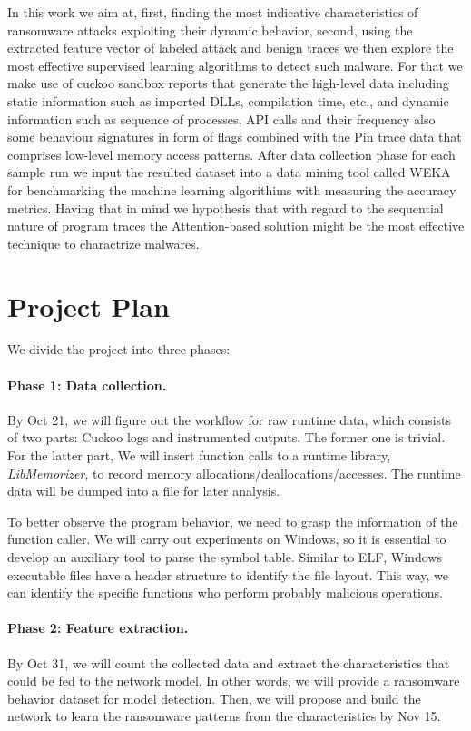 \documentclass[letterpaper,twocolumn,10pt]{article}
\begin{document}
In this work we aim at, first, finding the most indicative characteristics of ransomware attacks exploiting their dynamic behavior, second, using the extracted feature vector of labeled attack and benign traces we then explore the most effective supervised learning algorithms to detect such malware.
For that we make use of cuckoo sandbox reports that generate the high-level data including static information such as imported DLLs, compilation time, etc., and dynamic information such as sequence of processes, API calls and their frequency also some behaviour signatures in form of flags combined with the Pin trace data that comprises low-level memory access patterns. After data collection phase for each sample run we input the resulted dataset into a data mining tool called WEKA \cite{weka} for benchmarking the machine learning algorithims with measuring the accuracy metrics. 
Having that in mind we hypothesis that with regard to the sequential nature of program traces the Attention-based solution might be the most effective technique to charactrize malwares.

\section{Project Plan}

We divide the project into three phases:

\paragraph{Phase 1: Data collection.}

By Oct 21, we will figure out the workflow for raw runtime data, which consists of two parts: Cuckoo logs and instrumented outputs.
The former one is trivial. For the latter part, We will insert function calls to a runtime library, \textit{LibMemorizer}, to record memory allocations/deallocations/accesses. The runtime data will be dumped into a file for later analysis.

To better observe the program behavior, we need to grasp the information of the function caller.
We will carry out experiments on Windows, so it is essential to develop an auxiliary tool to parse the symbol table.
Similar to ELF, Windows executable files have a header structure to identify the file layout.
This way, we can identify the specific functions who perform probably malicious operations.

\paragraph{Phase 2: Feature extraction.} By Oct 31, we will count the collected data and extract the characteristics that could be fed to the network model.
In other words, we will provide a ransomware behavior dataset for model detection.
Then, we will propose and build the network to learn the ransomware patterns from the characteristics by Nov 15.
\end{document}
